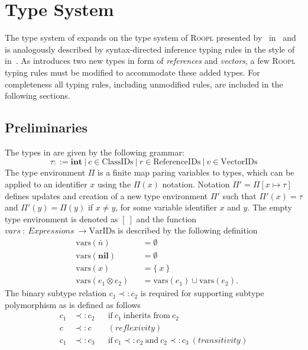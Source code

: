 \clearpage
\newpage
\pagebreak
\clearpage
\newpage
\pagebreak
\clearpage
\newpage
\pagebreak 
\clearpage
\newpage
\pagebreak

\section{Type System}
\label{sec:type-system}
The type system of \rooplpp expands on the type system of \textsc{Roopl} presented by~\citeauthor{th:roopl} in~\cite{th:roopl} and is analogously described by syntax-directed inference typing rules in the style of ~\citeauthor{wi:semantics} in~\cite{wi:semantics}. As \rooplpp introduces two new types in form of \textit{references} and \textit{vectors}, a few \textsc{Roopl} typing rules must be modified to accommodate these added types. For completeness all typing rules, including unmodified rules, are included in the following sections. 

\subsection{Preliminaries}
\label{subsec:preliminaries}
The types in \rooplpp are given by the following grammar:
\begin{equation*}
    \tau ::= \textbf{int}\ |\ c \in \text{ClassIDs}\ |\ r \in \text{ReferenceIDs}\ |\ v \in \text{VectorIDs}
\end{equation*}
The type environment $\Pi$ is a finite map paring variables to types, which can be applied to an identifier $x$ using the $\Pi(x)$ notation. Notation $\Pi' = \Pi[x \mapsto \tau]$ defines updates and creation of a new type environment $\Pi'$ such that $\Pi'(x) = \tau$ and $\Pi'(y) = \Pi(y)$ if $x \not= y$, for some variable identifier $x$ and $y$. The empty type environment is denoted as $[\ ]$ and the function $vars\ :\ Expressions\ \to \text{VarIDs}$ is described by the following definition
\begin{align*}
    &\text{vars}(\bar{n}) &&= \emptyset\\
    &\text{vars}(\textbf{nil}) &&= \emptyset\\
    &\text{vars}(x) &&= \{\ x\ \}\\
    &\text{vars}(e_1 \otimes e_2) &&= \text{vars}(e_1) \cup \text{vars}(e_2).
\end{align*}
The binary subtype relation $c_1 \prec: c_2$ is required for supporting subtype polymorphism as is defined as follows
\begin{align*}
    c_1 &\prec: c_2 &&\text{if}\ c_1\ \text{inherits from}\ c_2\\
    c   &\prec: c   &&(reflexivity)\\
    c_1 &\prec: c_3 &&\text{if}\ c_1 \prec: c_2\ \text{and}\ c_2 \prec: c_3\ (transitivity)
\end{align*}

